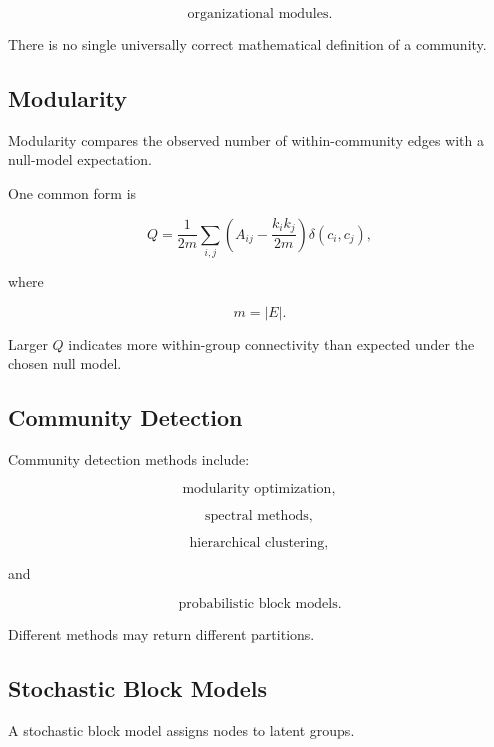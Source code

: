 \[
\boxed{
\text{organizational modules}.
}
\]

There is no single universally correct mathematical definition of a
community.

\subsection{Modularity}
\label{subsec:network-modularity}

Modularity compares the observed number of within-community edges with a
null-model expectation.

One common form is

\[
\boxed{
Q
=
\frac{1}{2m}
\sum_{i,j}
\left(
A_{ij}
-
\frac{k_ik_j}{2m}
\right)
\delta(c_i,c_j),
}
\]

where

\[
m=|E|.
\]

Larger \(Q\) indicates more within-group connectivity than expected under the
chosen null model.

\subsection{Community Detection}
\label{subsec:community-detection}

Community detection methods include:

\[
\boxed{
\text{modularity optimization},
}
\]

\[
\boxed{
\text{spectral methods},
}
\]

\[
\boxed{
\text{hierarchical clustering},
}
\]

and

\[
\boxed{
\text{probabilistic block models}.
}
\]

Different methods may return different partitions.

\subsection{Stochastic Block Models}
\label{subsec:stochastic-block-models}

A stochastic block model assigns nodes to latent groups.

